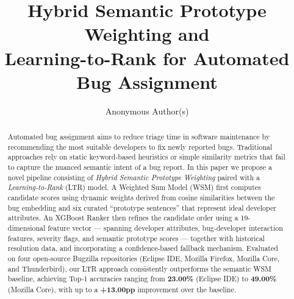 \documentclass[sigconf,review,anonymous]{acmart}
\begin{document}
\title{Hybrid Semantic Prototype Weighting and\\
       Learning-to-Rank for Automated Bug Assignment}

\author{Anonymous Author(s)}

\begin{abstract}
Automated bug assignment aims to reduce triage time in software maintenance
by recommending the most suitable developers to fix newly reported bugs.
Traditional approaches rely on static keyword-based heuristics or simple
similarity metrics that fail to capture the nuanced semantic intent of a bug
report.
In this paper we propose a novel pipeline consisting of
\emph{Hybrid Semantic Prototype Weighting} paired with a
\emph{Learning-to-Rank} (LTR) model.
A Weighted Sum Model (WSM) first computes candidate scores using dynamic
weights derived from cosine similarities between the bug embedding and six
curated ``prototype sentences'' that represent ideal developer attributes.
An XGBoost Ranker then refines the candidate order using a 19-dimensional
feature vector --- spanning developer attributes, bug-developer interaction
features, severity flags, and semantic prototype scores --- together with
historical resolution data, and incorporating a confidence-based fallback
mechanism.
Evaluated on four open-source Bugzilla repositories (Eclipse IDE, Mozilla
Firefox, Mozilla Core, and Thunderbird), our LTR approach consistently
outperforms the semantic WSM baseline, achieving Top-1 accuracies ranging from \textbf{23.00\%} (Eclipse IDE) to \textbf{49.00\%} (Mozilla Core),
with up to a \textbf{+13.00pp} improvement over the baseline.
\end{abstract}


\maketitle

\end{document}
